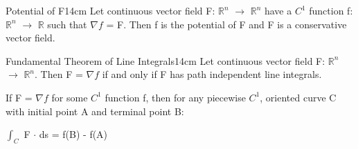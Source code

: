     \newpage



    \begin{definition}{Potential of F}{14cm}
        Let continuous vector field F: $\mathbb{R}^n$ $\rightarrow$ $\mathbb{R}^n$
        have a $C^1$ function f: $\mathbb{R}^n$ $\rightarrow$ $\mathbb{R}$
        such that $\nabla f$ = F.
        Then f is the {\color{lblue} potential} of F
        and F is a {\color{lblue} conservative vector field}.
    \end{definition}

    \vspace{0.5cm}



    \begin{wtheorem}{Fundamental Theorem of Line Integrals}{14cm}
        Let continuous vector field F: $\mathbb{R}^n$ $\rightarrow$ $\mathbb{R}^n$.
        Then F = $\nabla f$ if and only if F has path independent
        line integrals.

        If F = $\nabla f$ for some $C^1$ function f, then
        for any piecewise $C^1$, oriented curve C with initial point A and
        terminal point B:

        \hspace{0.5cm}
        $\int_C$ F $\cdot$ ds
        = f(B) - f(A)
    \end{wtheorem}


